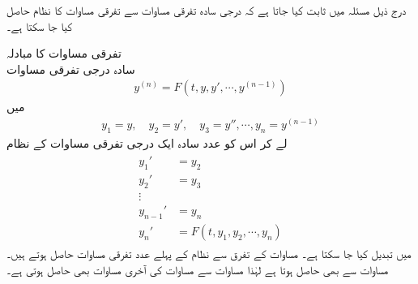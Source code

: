 درج ذیل مسئلہ میں ثابت کیا جاتا ہے کہ  درجی سادہ تفرقی مساوات  سے تفرقی مساوات کا نظام حاصل کیا جا سکتا ہے۔

\quad تفرقی مساوات کا مبادلہ\\
سادہ  درجی تفرقی مساوات
\begin{align}\label{مساوات_بلند_درجی_سے_سادہ_الف}
y^{(n)}=F(t,y,y',\cdots,y^{(n-1)})
\end{align}
میں
\begin{align}\label{مساوات_بلند_درجی_سے_سادہ_ب}
y_1=y,\quad y_2=y',\quad y_3=y'', \cdots, y_n=y^{(n-1)}
\end{align}
لے کر اس کو   عدد سادہ ایک درجی تفرقی مساوات کے نظام
\begin{gather}
\begin{aligned}\label{مساوات_بلند_درجی_سے_سادہ_پ}
y_1'&=y_2\\
y_2'&=y_3\\
\vdots\\
y_{n-1}'&=y_n\\
y_n'&=F(t,y_1,y_2,\cdots,y_n)
\end{aligned}
\end{gather}
 میں تبدیل کیا جا سکتا ہے۔
مساوات  کے تفرق سے نظام کے پہلے  عدد تفرقی مساوات حاصل ہوتے ہیں۔مساوات  سے  بھی حاصل ہوتا ہے لہٰذا مساوات  سے مساوات  کی آخری مساوات بھی حاصل ہوتی ہے۔

